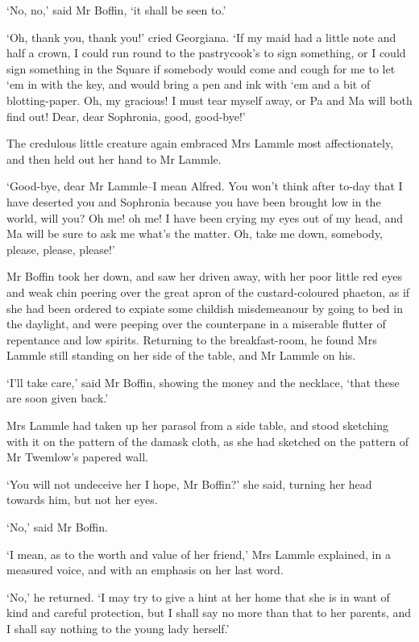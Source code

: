 ‘No, no,’ said Mr Boffin, ‘it shall be seen to.’

‘Oh, thank you, thank you!’ cried Georgiana. ‘If my maid had a little
note and half a crown, I could run round to the pastrycook’s to sign
something, or I could sign something in the Square if somebody would
come and cough for me to let ‘em in with the key, and would bring a pen
and ink with ‘em and a bit of blotting-paper. Oh, my gracious! I must
tear myself away, or Pa and Ma will both find out! Dear, dear Sophronia,
good, good-bye!’

The credulous little creature again embraced Mrs Lammle most
affectionately, and then held out her hand to Mr Lammle.

‘Good-bye, dear Mr Lammle--I mean Alfred. You won’t think after to-day
that I have deserted you and Sophronia because you have been brought low
in the world, will you? Oh me! oh me! I have been crying my eyes out of
my head, and Ma will be sure to ask me what’s the matter. Oh, take me
down, somebody, please, please, please!’

Mr Boffin took her down, and saw her driven away, with her poor
little red eyes and weak chin peering over the great apron of the
custard-coloured phaeton, as if she had been ordered to expiate some
childish misdemeanour by going to bed in the daylight, and were peeping
over the counterpane in a miserable flutter of repentance and low
spirits. Returning to the breakfast-room, he found Mrs Lammle still
standing on her side of the table, and Mr Lammle on his.

‘I’ll take care,’ said Mr Boffin, showing the money and the necklace,
‘that these are soon given back.’

Mrs Lammle had taken up her parasol from a side table, and stood
sketching with it on the pattern of the damask cloth, as she had
sketched on the pattern of Mr Twemlow’s papered wall.

‘You will not undeceive her I hope, Mr Boffin?’ she said, turning her
head towards him, but not her eyes.

‘No,’ said Mr Boffin.

‘I mean, as to the worth and value of her friend,’ Mrs Lammle explained,
in a measured voice, and with an emphasis on her last word.

‘No,’ he returned. ‘I may try to give a hint at her home that she is in
want of kind and careful protection, but I shall say no more than that
to her parents, and I shall say nothing to the young lady herself.’

